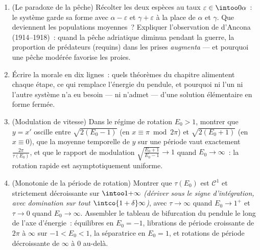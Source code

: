 \begin{problem}
\begin{enumerate}[resume]
        d'équilibre, quelle que soit l'amplitude
        \emph{(intégrer $(\ln x)' = \alpha - \beta y$ sur une
        période)}.
  \item (Le paradoxe de la pêche) Récolter les deux espèces
        au taux $\varepsilon \in \intoo0\alpha$~: le système
        garde sa forme avec $\alpha - \varepsilon$ et $\gamma
        + \varepsilon$ à la place de $\alpha$ et $\gamma$.
        Que deviennent les populations moyennes~? Expliquer
        l'observation de d'Ancona (1914--1918)~: quand la
        pêche adriatique diminua pendant la guerre, la
        proportion de prédateurs (requins) dans les prises
        \emph{augmenta} --- et pourquoi une pêche modérée
        favorise les proies.
  \item Écrire la morale en dix lignes~: quels théorèmes du
        chapitre alimentent chaque étape, ce qui remplace
        l'énergie du pendule, et pourquoi ni l'un ni l'autre
        système n'a eu besoin --- ni n'admet --- d'une
        solution élémentaire en forme fermée.

  \item (Modulation de vitesse) Dans le régime de rotation
        $E_0 > 1$, montrer que $y = x'$ oscille entre
        $\sqrt{2(E_0 - 1)}$ (en $x \equiv \pi \bmod 2\pi$)
        et $\sqrt{2(E_0 + 1)}$ (en $x \equiv 0$), que la
        moyenne temporelle de $y$ sur une période vaut
        exactement $\frac{2\pi}{\tau(E_0)}$, et que le
        rapport de modulation
        $\sqrt{\frac{E_0 + 1}{E_0 - 1}} \to 1$ quand $E_0
        \to \infty$~: la rotation rapide est
        asymptotiquement uniforme.
  \item (Monotonie de la période de rotation) Montrer que
        $\tau(E_0)$ est $\mathcal C^1$ et strictement
        décroissante sur $\intoo1{+\infty}$
        \emph{(dériver sous le signe d'intégration, avec
        domination sur tout $\intco{1 + \delta}\infty$)},
        avec $\tau \to \infty$ quand $E_0 \to 1^+$ et $\tau
        \to 0$ quand $E_0 \to \infty$. Assembler le tableau
        de bifurcation  du pendule le long de l'axe
        d'énergie~: équilibres en $E_0 = -1$, librations de
        période croissante de $2\pi$ à $\infty$ sur $-1 <
        E_0 < 1$, la séparatrice en $E_0 = 1$, et rotations
        de période décroissante de $\infty$ à $0$ au-delà.
\end{enumerate}
\end{problem}

